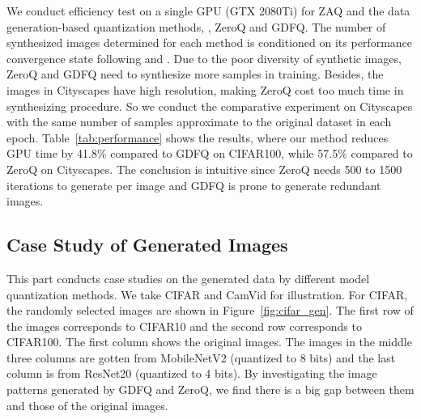 \documentclass[final]{cvpr}
\begin{document}
We conduct efficiency test on a single GPU (GTX 2080Ti) for ZAQ and the data generation-based quantization methods, \ie, ZeroQ and GDFQ.
The number of synthesized images determined for each method is conditioned on its performance convergence state following \cite{cai2020zeroq} and \cite{xu2020generative}. 
Due to the poor diversity of synthetic images, ZeroQ and GDFQ need to synthesize more samples in training. 
Besides, the images in Cityscapes have high resolution, making ZeroQ cost too much time in synthesizing procedure.
So we conduct the comparative experiment on Cityscapes with the same number of samples approximate to the original dataset in each epoch.
Table~\ref{tab:performance} shows the results, where our method reduces GPU time by 41.8\% compared to GDFQ on CIFAR100, while 57.5\% compared to ZeroQ on Cityscapes.
The conclusion is intuitive since ZeroQ needs 500 to 1500 iterations to generate per image and GDFQ is prone to generate redundant images.

\begin{table}[!h]
  \centering
  \caption{Time cost comparison.}
  \label{tab:performance}\vspace{-2mm}
\end{table}


\subsection{Case Study of Generated Images}

This part conducts case studies on the generated data by different model quantization methods.
We take CIFAR and CamVid for illustration.
For CIFAR, the randomly selected images are shown in Figure~\ref{fig:cifar_gen}.
The first row of the images corresponds to CIFAR10 and the second row corresponds to CIFAR100.
The first column shows the original images. 
The images in the middle three columns are gotten from MobileNetV2 (quantized to 8 bits) and the last column is from ResNet20 (quantized to 4 bits).
By investigating the image patterns generated by GDFQ and ZeroQ, we find there is a big gap between them and those of the original images.
\end{document}
